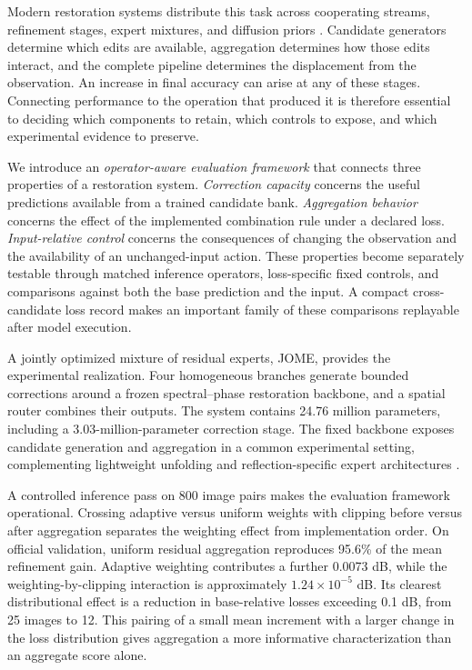 \documentclass[12pt]{article}
\begin{document}
Modern restoration systems distribute this task across cooperating streams, refinement stages, expert mixtures, and diffusion priors \citep{wan2020corrn,li2020cascaded,park2026complementary,hu2026dereflection}. Candidate generators determine which edits are available, aggregation determines how those edits interact, and the complete pipeline determines the displacement from the observation. An increase in final accuracy can arise at any of these stages. Connecting performance to the operation that produced it is therefore essential to deciding which components to retain, which controls to expose, and which experimental evidence to preserve.

We introduce an \emph{operator-aware evaluation framework} that connects three properties of a restoration system. \emph{Correction capacity} concerns the useful predictions available from a trained candidate bank. \emph{Aggregation behavior} concerns the effect of the implemented combination rule under a declared loss. \emph{Input-relative control} concerns the consequences of changing the observation and the availability of an unchanged-input action. These properties become separately testable through matched inference operators, loss-specific fixed controls, and comparisons against both the base prediction and the input. A compact cross-candidate loss record makes an important family of these comparisons replayable after model execution.

A jointly optimized mixture of residual experts, JOME, provides the experimental realization. Four homogeneous branches generate bounded corrections around a frozen spectral--phase restoration backbone, and a spatial router combines their outputs. The system contains 24.76 million parameters, including a 3.03-million-parameter correction stage. The fixed backbone exposes candidate generation and aggregation in a common experimental setting, complementing lightweight unfolding and reflection-specific expert architectures \citep{huang2025dexnet,park2026complementary}.

A controlled inference pass on 800 image pairs makes the evaluation framework operational. Crossing adaptive versus uniform weights with clipping before versus after aggregation separates the weighting effect from implementation order. On official validation, uniform residual aggregation reproduces 95.6\% of the mean refinement gain. Adaptive weighting contributes a further 0.0073 dB, while the weighting-by-clipping interaction is approximately $1.24\times10^{-5}$ dB. Its clearest distributional effect is a reduction in base-relative losses exceeding 0.1 dB, from 25 images to 12. This pairing of a small mean increment with a larger change in the loss distribution gives aggregation a more informative characterization than an aggregate score alone.
\end{document}
